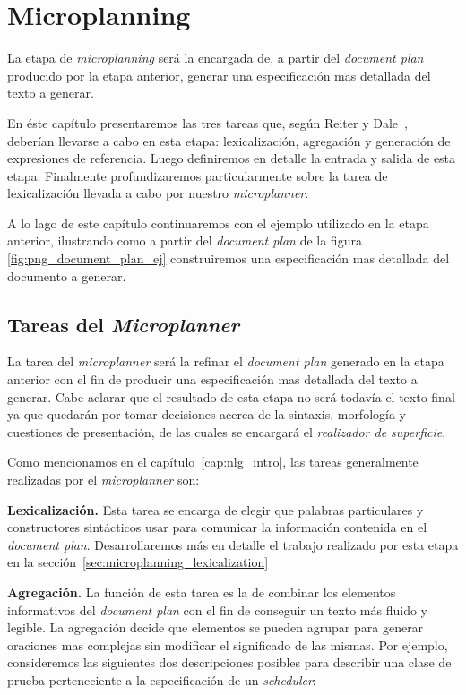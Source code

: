 \chapter{Microplanning}
\label{cap:microplanning}

La etapa de \textit{microplanning} será la encargada de, a partir del \textit{document plan} producido por la etapa anterior, generar una especificación mas detallada del texto a generar. 

En éste capítulo presentaremos las tres tareas que, según Reiter y Dale~\cite{reiter_dale}, deberían llevarse a cabo en esta etapa: lexicalización, agregación y generación de expresiones de referencia. Luego definiremos en detalle la entrada y salida de esta etapa. Finalmente profundizaremos particularmente sobre la tarea de lexicalización llevada a cabo por nuestro \textit{microplanner}. 

A lo lago de este capítulo continuaremos con el ejemplo utilizado en la etapa anterior, ilustrando como a partir del \textit{document plan} de la figura \ref{fig:png_document_plan_ej} construiremos una especificación mas detallada del documento a generar.

\section{Tareas del \textit{Microplanner}}

La tarea del \textit{microplanner} será la refinar el \textit{document plan} generado en la etapa anterior con el fin de producir una especificación mas detallada del texto a generar. Cabe aclarar que el resultado de esta etapa no será todavía el texto final ya que quedarán por tomar decisiones acerca de la sintaxis, morfología y cuestiones de presentación, de las cuales se encargará el \emph{realizador de superficie}.

Como mencionamos en el capítulo~\ref{cap:nlg_intro}, las tareas generalmente realizadas por el \emph{microplanner} son:

\medskip
\noindent
\textbf{Lexicalización.} Esta tarea se encarga de elegir que palabras particulares y constructores sintácticos usar para comunicar la información contenida en el \textit{document plan}. Desarrollaremos más en detalle el trabajo realizado por esta etapa en la sección~\ref{sec:microplanning_lexicalization}


\medskip
\noindent
\textbf{Agregación.} La función de esta tarea es la de combinar los elementos informativos del \emph{document plan} con el fin de conseguir un texto más fluido y legible. La agregación decide que elementos se pueden agrupar para generar oraciones mas complejas sin modificar el significado de las mismas. Por ejemplo, consideremos las siguientes dos descripciones posibles para describir una clase de prueba perteneciente a la especificación de un \emph{scheduler}:

